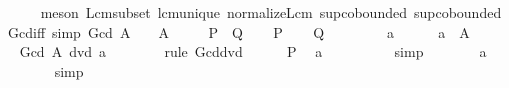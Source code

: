 \begin{isabellebody}
\ \ \ \ \isamarkupfalse%
\ {\isacharparenleft}{\kern0pt}meson\ Lcm{\isacharunderscore}{\kern0pt}subset\ lcm{\isacharunderscore}{\kern0pt}unique\ normalize{\isacharunderscore}{\kern0pt}Lcm\ sup{\isachardot}{\kern0pt}cobounded{}\ sup{\isachardot}{\kern0pt}cobounded{}{\isacharparenright}{\kern0pt}\isanewline
{}\isamarkupfalse%
%
\endisatagproof
{\isafoldproof}%
%
\isadelimproof
\isanewline
%
\endisadelimproof
\isanewline
{}\isamarkupfalse%
\ Gcd{\isacharunderscore}{\kern0pt}{}{\isacharunderscore}{\kern0pt}iff\ {\isacharbrackleft}{\kern0pt}simp{\isacharbrackright}{\kern0pt}{\isacharcolon}{\kern0pt}\ {\isachardoublequoteopen}Gcd\ A\ {\isacharequal}{\kern0pt}\ {}\ {\isasymlongleftrightarrow}\ A\ {\isasymsubseteq}\ {\isacharbraceleft}{\kern0pt}{}{\isacharbraceright}{\kern0pt}{\isachardoublequoteclose}\isanewline
\ \ {\isacharparenleft}{\kern0pt}\ {\isachardoublequoteopen}{\isacharquery}{\kern0pt}P\ {\isasymlongleftrightarrow}\ {\isacharquery}{\kern0pt}Q{\isachardoublequoteclose}{\isacharparenright}{\kern0pt}\isanewline
%
\isadelimproof
%
\endisadelimproof
%
\isatagproof
{}\isamarkupfalse%
\isanewline
\ \ \isamarkupfalse%
\ {\isacharquery}{\kern0pt}P\isanewline
\ \ \isamarkupfalse%
\ {\isacharquery}{\kern0pt}Q\isanewline
\ \ \isamarkupfalse%
\isanewline
\ \ \ \ \isamarkupfalse%
\ a\isanewline
\ \ \ \ \isamarkupfalse%
\ {\isachardoublequoteopen}a\ {\isasymin}\ A{\isachardoublequoteclose}\isanewline
\ \ \ \ \isamarkupfalse%
\ \isamarkupfalse%
\ {\isachardoublequoteopen}Gcd\ A\ dvd\ a{\isachardoublequoteclose}\isanewline
\ \ \ \ \ \ \isamarkupfalse%
\ {\isacharparenleft}{\kern0pt}rule\ Gcd{\isacharunderscore}{\kern0pt}dvd{\isacharparenright}{\kern0pt}\isanewline
\ \ \ \ \isamarkupfalse%
\ {\isacartoucheopen}{\isacharquery}{\kern0pt}P{\isacartoucheclose}\ \isamarkupfalse%
\ {\isachardoublequoteopen}a\ {\isacharequal}{\kern0pt}\ {}{\isachardoublequoteclose}\isanewline
\ \ \ \ \ \ \isamarkupfalse%
\ simp\isanewline
\ \ \ \ \isamarkupfalse%
\ \isamarkupfalse%
\ {\isachardoublequoteopen}a\ {\isasymin}\ {\isacharbraceleft}{\kern0pt}{}{\isacharbraceright}{\kern0pt}{\isachardoublequoteclose}\isanewline
\ \ \ \ \ \ \isamarkupfalse%
\ simp\isanewline
\ \ \isamarkupfalse%

\end{isabellebody}

